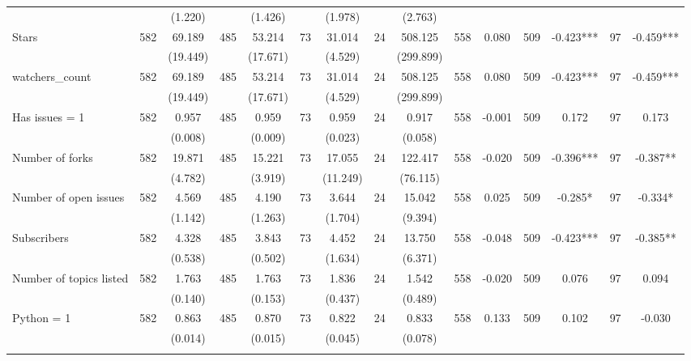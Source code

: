 \begin{tabular}{@{\extracolsep{5pt}}lcccccccccccccc}
 &   & (1.220)  &   & (1.426)  &   & (1.978)  &   & (2.763)  &   &  &   &  &   &  \\ [1ex]
Stars   & 582    & 69.189    & 485    & 53.214    & 73    & 31.014    & 24    & 508.125    & 558    & 0.080    & 509    & -0.423***    & 97    & -0.459***   \\
 &   & (19.449)  &   & (17.671)  &   & (4.529)  &   & (299.899)  &   &  &   &  &   &  \\ [1ex]
watchers\_count   & 582    & 69.189    & 485    & 53.214    & 73    & 31.014    & 24    & 508.125    & 558    & 0.080    & 509    & -0.423***    & 97    & -0.459***   \\
 &   & (19.449)  &   & (17.671)  &   & (4.529)  &   & (299.899)  &   &  &   &  &   &  \\ [1ex]
Has issues = 1   & 582    & 0.957    & 485    & 0.959    & 73    & 0.959    & 24    & 0.917    & 558    & -0.001    & 509    & 0.172    & 97    & 0.173   \\
 &   & (0.008)  &   & (0.009)  &   & (0.023)  &   & (0.058)  &   &  &   &  &   &  \\ [1ex]
Number of forks   & 582    & 19.871    & 485    & 15.221    & 73    & 17.055    & 24    & 122.417    & 558    & -0.020    & 509    & -0.396***    & 97    & -0.387**   \\
 &   & (4.782)  &   & (3.919)  &   & (11.249)  &   & (76.115)  &   &  &   &  &   &  \\ [1ex]
Number of open issues   & 582    & 4.569    & 485    & 4.190    & 73    & 3.644    & 24    & 15.042    & 558    & 0.025    & 509    & -0.285*    & 97    & -0.334*   \\
 &   & (1.142)  &   & (1.263)  &   & (1.704)  &   & (9.394)  &   &  &   &  &   &  \\ [1ex]
Subscribers   & 582    & 4.328    & 485    & 3.843    & 73    & 4.452    & 24    & 13.750    & 558    & -0.048    & 509    & -0.423***    & 97    & -0.385**   \\
 &   & (0.538)  &   & (0.502)  &   & (1.634)  &   & (6.371)  &   &  &   &  &   &  \\ [1ex]
Number of topics listed   & 582    & 1.763    & 485    & 1.763    & 73    & 1.836    & 24    & 1.542    & 558    & -0.020    & 509    & 0.076    & 97    & 0.094   \\
 &   & (0.140)  &   & (0.153)  &   & (0.437)  &   & (0.489)  &   &  &   &  &   &  \\ [1ex]
Python = 1   & 582    & 0.863    & 485    & 0.870    & 73    & 0.822    & 24    & 0.833    & 558    & 0.133    & 509    & 0.102    & 97    & -0.030   \\
 &   & (0.014)  &   & (0.015)  &   & (0.045)  &   & (0.078)  &   &  &   &  &   &  \\ [1ex]
\hline \hline \\[-1.8ex]

\end{tabular}
